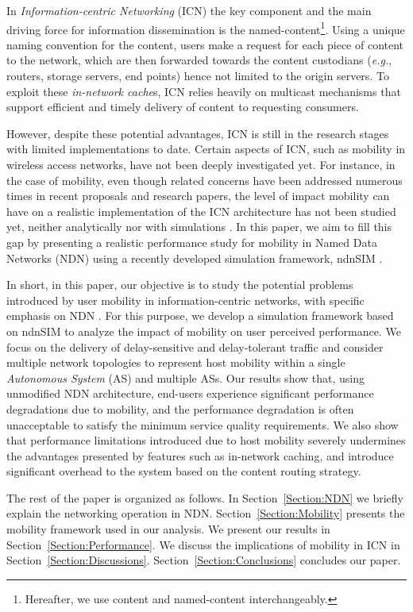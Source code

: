 \documentclass[conference]{IEEEtran}
\begin{document}
In \emph{Information-centric Networking} (ICN) the key component and the main driving force for information dissemination is the named-content\footnote{Hereafter, we use content and named-content interchangeably.}. Using a unique naming convention for the content, users make a request for each piece of content to the network, which are then forwarded towards the content custodians (\emph{e.g.}, routers, storage servers, end points) hence not limited to the origin servers. To exploit these \emph{in-network cache}s, ICN relies heavily on multicast mechanisms that support efficient and timely delivery of content to requesting consumers.

However, despite these potential advantages, ICN is still in the research stages with limited implementations to date. Certain aspects of ICN, such as mobility in wireless access networks, have not been deeply investigated yet. For instance, in the case of mobility, even though related concerns have been addressed numerous times in recent proposals and research papers, the level of impact mobility can have on a realistic implementation of the ICN architecture has not been studied yet, neither analytically nor with simulations \cite{SurveyMobility}. In this paper, we aim to fill this gap by presenting a realistic performance study for mobility in Named Data Networks (NDN) using a recently developed simulation framework, ndnSIM \cite{ndnSIM}.

In short, in this paper, our objective is to study the potential problems introduced by user mobility in information-centric networks, with specific emphasis on NDN \cite{ndn,Jacobson}. For this purpose, we develop a simulation framework based on ndnSIM to analyze the impact of mobility on user perceived performance. We focus on the delivery of delay-sensitive and delay-tolerant traffic and consider multiple network topologies to represent host mobility within a single \emph{Autonomous System} (AS) and multiple ASs. Our results show that, using unmodified NDN architecture, end-users experience significant performance degradations due to mobility, and the performance degradation is often unacceptable to satisfy the minimum service quality requirements. We also show that performance limitations introduced due to host mobility severely undermines the advantages presented by features such as in-network caching, and introduce significant overhead to the system based on the content routing strategy.

The rest of the paper is organized as follows. In Section~\ref{Section:NDN} we briefly explain the networking operation in NDN. Section~\ref{Section:Mobility} presents the mobility framework used in our analysis. We present our results in Section~\ref{Section:Performance}. We discuss the implications of mobility in ICN in Section~\ref{Section:Discussions}. Section~\ref{Section:Conclusions} concludes our paper.
\end{document}
